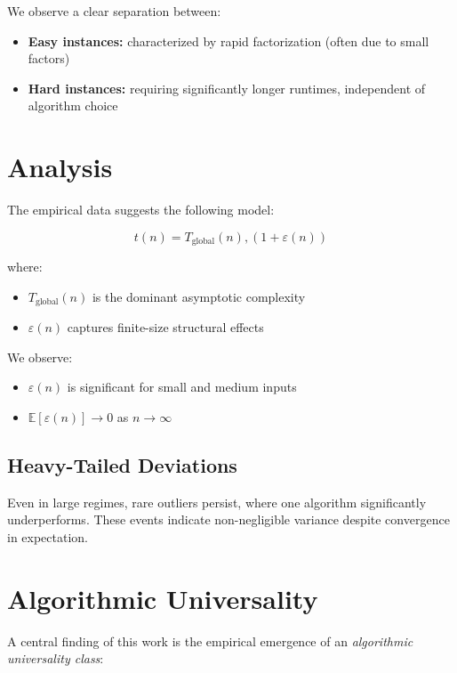 \documentclass[11pt,a4paper]{article}
\begin{document}
	We observe a clear separation between:
	
	\begin{itemize}
		\item \textbf{Easy instances:} characterized by rapid factorization (often due to small factors)
		\item \textbf{Hard instances:} requiring significantly longer runtimes, independent of algorithm choice
	\end{itemize}
	
	\section{Analysis}
	
	The empirical data suggests the following model:
	
	\begin{equation}
		t(n) = T_{\text{global}}(n),(1 + \varepsilon(n))
	\end{equation}
	
	where:
	
	\begin{itemize}
		\item $T_{\text{global}}(n)$ is the dominant asymptotic complexity
		\item $\varepsilon(n)$ captures finite-size structural effects
	\end{itemize}
	
	We observe:
	
	\begin{itemize}
		\item $\varepsilon(n)$ is significant for small and medium inputs
		\item $\mathbb{E}[\varepsilon(n)] \to 0$ as $n \to \infty$
	\end{itemize}
	
	\subsection{Heavy-Tailed Deviations}
	
	Even in large regimes, rare outliers persist, where one algorithm significantly underperforms. These events indicate non-negligible variance despite convergence in expectation.
	
	\section{Algorithmic Universality}
	
	A central finding of this work is the empirical emergence of an \emph{algorithmic universality class}:
	
\end{document}

